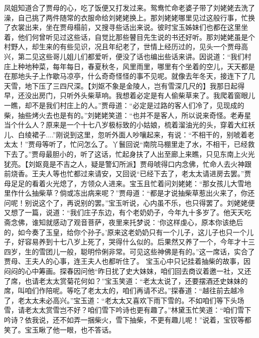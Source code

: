 \documentclass[12pt,oneside]{book}
\begin{document}
凤姐知道合了贾母的心，吃了饭便又打发过来。鸳鸯忙命老婆子带了刘姥姥去洗了澡，自己挑了两件随常的衣服命给刘姥姥换上。那刘姥姥哪里见过这般行事，忙换了衣裳出来，坐在贾母榻前，又搜寻些话出来说。彼时宝玉姊妹们也都在这里坐着，他们何曾听见过这些话，自觉比那些瞽目先生说的书还好听。那刘姥姥虽是个村野人，却生来的有些见识，况且年纪老了，世情上经历过的，见头一个贾母高兴，第二见这些哥儿姐儿们都爱听，便没了话也编出些话来讲。因说道：“我们村庄上种地种菜，每年每日，春夏秋冬，风里雨里，哪里有个坐着的空儿，天天都是在那地头子上作歇马凉亭，什么奇奇怪怪的事不见呢。就像去年冬天，接连下了几天雪，地下压了三四尺深。【刘妪不象是金陵人，岂有雪深几尺的】我那日起得早，还没出房门，只听外头柴草响。我想着必定是有人偷柴草来了。我爬着窗眼儿一瞧，却不是我们村庄上的人。”贾母道：“必定是过路的客人们冷了，见现成的柴，抽些烤火去也是有的。”刘姥姥笑道：“也并不是客人，所以说来奇怪。老寿星当个什么人？原来是一个十七八岁极标致的小姑娘，梳着溜油光的头，穿着大红袄儿、白绫裙子....”刚说到这里，忽听外面人吵嚷起来，有说：“不相干的，别唬着老太太！”贾母等听了，忙问怎么了。丫鬟回说“南院马棚里走了水，不相干，已经救下去了。”贾母最胆小的，听了这话，忙起身扶了人出至廊上来瞧，只见东南上火光犹亮。【刘妪竟是不吉之人，疑是警幻所派】贾母唬得口内念佛，忙命人去火神跟前烧香。王夫人等也忙都过来请安，又回说“已经下去了，老太太请进房去罢。”贾母足足的看着火光熄了，方领众人进来。宝玉且忙着问刘姥姥：“那女孩儿大雪地里作什么抽柴草？倘或冻出病来呢？”贾母道：“都是才说抽柴草惹出火来了，你还问呢！别说这个了，再说别的罢。”宝玉听说，心内虽不乐，也只得罢了。刘姥姥便又想了一篇，说道：“我们庄子东边，有个老奶奶子，今年九十多岁了。他天天吃斋念佛，谁知就感动了观音菩萨，夜里来托梦说：‘你这样虔心，原本你该绝后的，如今奏了玉皇，给你个孙子。’原来这老奶奶只有一个儿子，这儿子也只一个儿子，好容易养到十七八岁上死了，哭得什么似的。后果然又养了一个，今年才十三四岁，生的雪团儿一般，聪明伶俐非常。可见这些神佛是有的。”这一席话，实合了贾母、王夫人的心事，连王夫人也都听住了。
宝玉心中只记挂着抽柴的故事，因闷闷的心中筹画。探春因问他“昨日扰了史大妹妹，咱们回去商议着邀一社，又还了席，也请老太太赏菊花何如？”宝玉笑道：“老太太说了，还要摆酒还史妹妹的席，叫咱们作陪呢。等吃了老太太的，咱们再请不迟。”探春道：“越往前去越冷了，老太太未必高兴。”宝玉道：“老太太又喜欢下雨下雪的。不如咱们等下头场雪，请老太太赏雪岂不好？咱们雪下吟诗也更有趣了。”林黛玉忙笑道：“咱们雪下吟诗？依我说，还不如弄一捆柴火，雪下抽柴，不更有趣儿呢！”说着，宝钗等都笑了。宝玉瞅了他一眼，也不答话。
\end{document}
